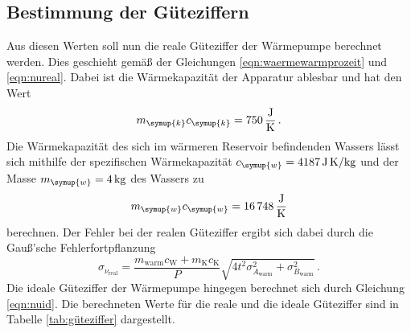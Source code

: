 \subsection{Bestimmung der Güteziffern}

Aus diesen Werten soll nun die reale Güteziffer der Wärmepumpe berechnet werden. Dies geschieht gemäß der Gleichungen
\ref{eqn:waermewarmprozeit} und \ref{eqn:nureal}. Dabei ist die Wärmekapazität
der Apparatur ablesbar und hat den Wert
\begin{equation}
  m_{\symup{k}}c_{\symup{k}}=\SI{750}{\joule\per\kelvin} \,. \nonumber
\end{equation}
Die Wärmekapazität des sich im wärmeren Reservoir befindenden Wassers lässt sich
mithilfe der spezifischen Wärmekapazität $c_{\symup{w}}=\SI{4187}{\joule\per\kilo\gram\kelvin}$
und der Masse $m_{\symup{w}}=\SI{4}{\kilo\gram}$ des Wassers zu
\begin{equation}
  m_{\symup{w}}c_{\symup{w}}=\SI{16748}{\joule\per\kelvin}  \nonumber
\end{equation}
berechnen.
Der Fehler bei der realen Güteziffer ergibt sich dabei durch die Gauß'sche Fehlerfortpflanzung
\begin{equation}
  \sigma_{\nu_\text{real}} = \frac{m_\text{warm} c_\text{W} + m_\text{K} c_\text{K}}{P}
  \sqrt{4 t^2 \sigma_{A_\text{warm}}^2 + \sigma_{B_\text{warm}}^2} \,.
\end{equation}
Die ideale Güteziffer der Wärmepumpe hingegen berechnet sich durch Gleichung
\ref{eqn:nuid}. Die berechneten Werte für die reale und die ideale Güteziffer
sind in Tabelle \ref{tab:güteziffer} dargestellt.

